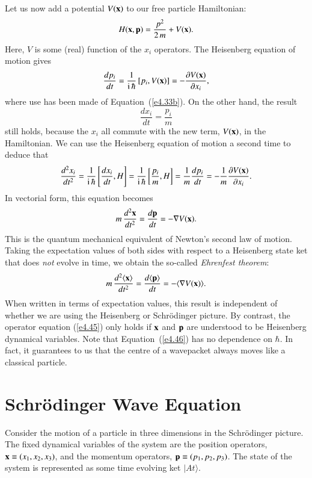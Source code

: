 Let us now add a potential $V({\bf x})$ to our free particle Hamiltonian:
\begin{equation}
H({\bf x},{\bf p}) = \frac{{p}^2}{2\,m} + V({\bf x}).
\end{equation}
Here, $V$ is some (real) function of the $x_i$ operators. The Heisenberg  equation of
motion gives
\begin{equation}
\frac{d p_i}{dt} = \frac{1}{{\rm i}\,\hbar} \,[p_i, V({\bf x})] = - \frac{\partial
V({\bf x})}{\partial x_i},
\end{equation}
where use has been made of Equation~(\ref{e4.33b}). On the other hand, the result
\begin{equation}
\frac{d x_i}{dt} = \frac{p_i}{m}
\end{equation}
still holds, because the $x_i$ all commute with the new term, $V({\bf x})$, in the
Hamiltonian. We can use the Heisenberg equation of motion a second time
to deduce that
\begin{equation}
\frac{d^2 x_i}{dt^2} = \frac{1}{{\rm i}\,\hbar} \left[\frac{dx_i}{dt}, H\right]
= \frac{1}{{\rm i}\,\hbar}\left[ \frac{p_i}{m}, H \right]
=\frac{1}{m}\frac{d p_i}{dt} = - \frac{1}{m} \frac{\partial V({\bf x})}{\partial x_i}.
\end{equation}
In vectorial form, this equation becomes
\begin{equation}\label{e4.45}
m\,\frac{d^2 {\bf x}}{d t^2} = \frac{d{\bf p}}{dt} =
- \nabla V({\bf x}).
\end{equation}
This is the quantum mechanical equivalent of Newton's second law of motion.
Taking the expectation values of both sides with respect to a Heisenberg
state ket that does {\em not}\/ evolve in  time, we obtain the so-called {\em Ehrenfest  theorem}:
\begin{equation}\label{e4.46}
m \,\frac{d^2\langle {\bf x}\rangle}{dt^2}= \frac{d\langle{\bf p}\rangle}{dt}
= - \langle \nabla V({\bf x})\rangle.
\end{equation}
When written in terms of expectation
values, this result is independent of whether we are using the Heisenberg or
Schr\"{o}dinger picture. By contrast, the operator equation (\ref{e4.45}) only holds
if ${\bf x}$ and ${\bf p}$ are understood to be Heisenberg dynamical variables.
Note that Equation~(\ref{e4.46}) has no dependence on $\hbar$. 
In fact, it guarantees to  us that the centre of
a wavepacket always moves like a classical particle.

\section{Schr\"{o}dinger Wave Equation}
Consider the motion of a particle 
in three dimensions in the Schr\"{o}dinger picture. The fixed dynamical variables of
the system are the position operators, ${\bf x}\equiv
(x_1, x_2, x_3)$, and the momentum operators, ${\bf p}\equiv (p_1, p_2, p_3)$.
The state of the system is represented as some time evolving ket $|At\rangle$.

